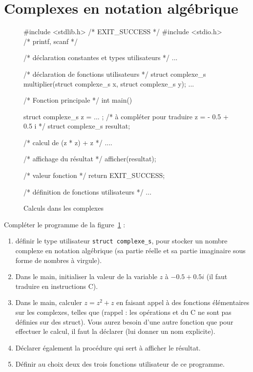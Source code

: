 \section{Complexes en notation algébrique}
\begin{figure}
\small
\begin{listing}{1}
#include <stdlib.h> /* EXIT_SUCCESS */
#include <stdio.h> /* printf, scanf */

/* déclaration constantes et types utilisateurs */
... 

/* déclaration de fonctions utilisateurs */
struct complexe_s multiplier(struct complexe_s x, struct complexe_s y);
...

/* Fonction principale */
int main()
{
   struct complexe_s z = ... ; /* à compléter pour traduire z = - 0.5 + 0.5 i */ 
   struct complexe_s resultat;
   
   /* calcul de (z * z) + z */
   ....

   /* affichage du résultat */
   afficher(resultat);

   /* valeur fonction */
  return EXIT_SUCCESS;
}

/* définition de fonctions utilisateurs */
...
\end{listing}
  \caption{Calculs dans les complexes}
  \label{fig:deuxj}
\end{figure}

\question 
Compléter le programme de la figure~\ref{fig:deuxj} :
\begin{enumerate}
\item définir le type utilisateur \verb+struct complexe_s+, pour stocker
  un nombre complexe en notation algébrique (sa partie réelle et sa
  partie imaginaire sous forme de nombres à virgule).%
\item Dans le main, initialiser la
  valeur de la variable $z$ à  $- 0.5 + 0.5 i$ (il faut traduire en
  instructions C).%
\item Dans le main, calculer $z = z^2 + z$ en faisant appel à des
  fonctions élémentaires sur les complexes, telles que  (rappel : les opérations \C{+} et
  \C{*} du C ne sont pas définies sur des struct). Vous aurez besoin %
  d'une autre fonction que  pour effectuer le calcul,
  il faut la déclarer (lui donner un nom explicite). 
\item  Déclarer également la procédure  qui
  sert à afficher le résultat.%
\item Définir au choix deux des trois fonctions utilisateur de ce programme.%
\end{enumerate}

